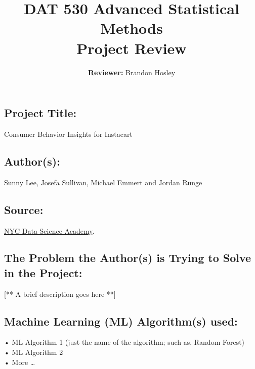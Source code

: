 \documentclass[]{article}
\title{\textbf{DAT 530 Advanced Statistical Methods}\\
	\normalsize{Project Review} }
\author{\textbf{Reviewer: }
	Brandon Hosley}
\begin{document}
\setlength{\droptitle}{-10em} 
\pretitle{\begin{flushleft}\LARGE} %
	\posttitle{\end{flushleft}}
\preauthor{\begin{flushleft}\large} %
	\postauthor{\end{flushleft}}
\predate{\begin{flushleft}\large} %
	\postdate{\end{flushleft}}
\maketitle

\vspace{-2em}

\subsection*{Project Title:}
Consumer Behavior Insights for Instacart

\subsection*{Author(s):}
Sunny Lee, Josefa Sullivan, Michael Emmert and Jordan Runge

\subsection*{Source:}
\href{https://nycdatascience.com/blog/student-works/recommendations-for-online-groceries/}{NYC Data Science Academy}.

\subsection*{The Problem the Author(s) is Trying to Solve in the Project:}
[** A brief description goes here **]

\subsection*{Machine Learning (ML) Algorithm(s) used:}
• ML Algorithm 1 (just the name of the algorithm; such as, Random Forest) \\
• ML Algorithm 2 \\
• More … 
\end{document}
